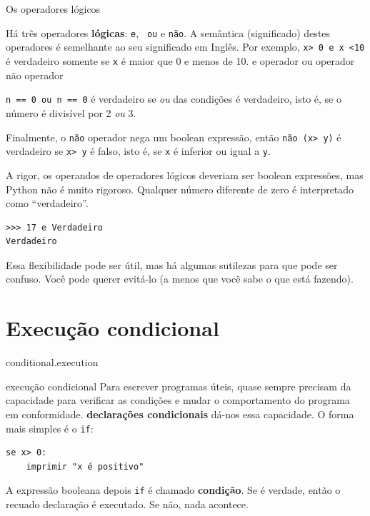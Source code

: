 \documentclass[10pt]{book}
\begin{document}
\begin{exercise}
{\section{} Os operadores lógicos

Há três operadores {\bf lógicas}: {\tt e}, {\tt
ou} e {\tt não}. A semântica (significado) destes operadores é
semelhante ao seu significado em Inglês. Por exemplo,
{\tt x> 0 e x <10} é verdadeiro somente se {\tt x} é maior que 0
{\Em} e menos de 10.
\index{} e operador
\index{} ou operador
\index{} não operador

{\tt n \2 == 0 ou n \3 == 0} é verdadeiro se {\em ou} das condições
é verdadeiro, isto é, se o número é divisível por 2 {\em ou} 3.

Finalmente, o {\tt não} operador nega um boolean
expressão, então {\tt não (x> y)} é verdadeiro se {\tt x> y} é falso,
isto é, se {\tt x} é inferior ou igual a {\tt y}.

A rigor, os operandos de operadores lógicos deveriam ser
boolean expressões, mas Python não é muito rigoroso.
Qualquer número diferente de zero é interpretado como ``verdadeiro''.

\begin{verbatim}
>>> 17 e Verdadeiro
Verdadeiro
\end{verbatim}
%
Essa flexibilidade pode ser útil, mas há algumas sutilezas para
que pode ser confuso. Você pode querer evitá-lo (a menos que
você sabe o que está fazendo).


\section{Execução condicional}
\label{} conditional.execution

\index{} execução condicional
Para escrever programas úteis, quase sempre precisam da capacidade
para verificar as condições e mudar o comportamento do programa
em conformidade. {\bf declarações condicionais} dá-nos essa capacidade. O
forma mais simples é o {\tt if}:

\begin{verbatim}
se x> 0:
    imprimir "x é positivo"
\end{verbatim}
%
A expressão booleana depois {\tt if} é
chamado {\bf condição}. Se é verdade, então o recuado
declaração é executado. Se não, nada acontece.

}
\end{exercise}
\end{document}
